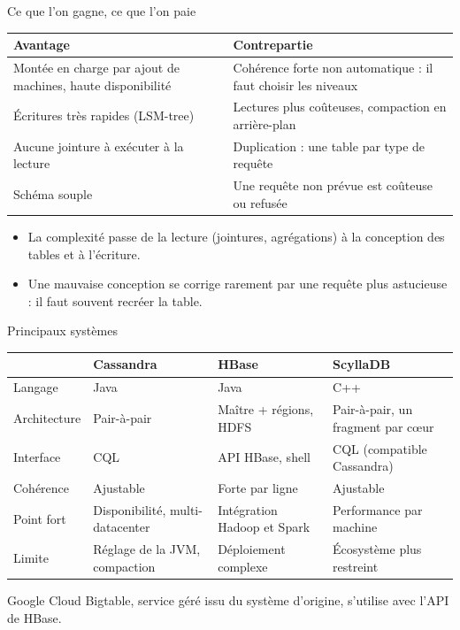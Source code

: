 \documentclass[aspectratio=169,10pt]{beamer}
\begin{document}
\begin{frame}{Ce que l'on gagne, ce que l'on paie}
  \small
  \begin{tabularx}{\textwidth}{@{}>{\raggedright\arraybackslash}X>{\raggedright\arraybackslash}X@{}}
    \toprule
    Avantage & Contrepartie \\
    \midrule
    Montée en charge par ajout de machines, haute disponibilité & Cohérence forte non automatique : il faut choisir les niveaux \\
    Écritures très rapides (LSM-tree) & Lectures plus coûteuses, compaction en arrière-plan \\
    Aucune jointure à exécuter à la lecture & Duplication : une table par type de requête \\
    Schéma souple & Une requête non prévue est coûteuse ou refusée \\
    \bottomrule
  \end{tabularx}
  \vspace{0.5cm}
  \normalsize
  \begin{itemize}
    \item La complexité passe de la lecture (jointures, agrégations) à la conception des tables et à l'écriture.
    \item Une mauvaise conception se corrige rarement par une requête plus astucieuse : il faut souvent recréer la table.
  \end{itemize}
\end{frame}

\begin{frame}{Principaux systèmes}
  \small
  \begin{tabularx}{\textwidth}{@{}>{\raggedright\arraybackslash}p{2.3cm}>{\raggedright\arraybackslash}X>{\raggedright\arraybackslash}X>{\raggedright\arraybackslash}X@{}}
    \toprule
     & Cassandra & HBase & ScyllaDB \\
    \midrule
    Langage & Java & Java & C++ \\
    Architecture & Pair-à-pair & Maître + régions, HDFS & Pair-à-pair, un fragment par cœur \\
    Interface & CQL & API HBase, shell & CQL (compatible Cassandra) \\
    Cohérence & Ajustable & Forte par ligne & Ajustable \\
    Point fort & Disponibilité, multi-datacenter & Intégration Hadoop et Spark & Performance par machine \\
    Limite & Réglage de la JVM, compaction & Déploiement complexe & Écosystème plus restreint \\
    \bottomrule
  \end{tabularx}
  \vspace{0.4cm}
  \normalsize
  Google Cloud Bigtable, service géré issu du système d'origine, s'utilise avec l'API de HBase.
\end{frame}
\end{document}
